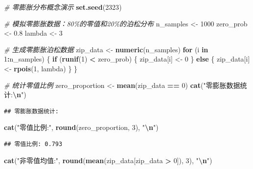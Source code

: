 \documentclass[
]{book}
\newenvironment{Shaded}{\begin{snugshade}}{\end{snugshade}}
\newcommand{\CommentTok}[1]{\textcolor[rgb]{0.56,0.35,0.01}{\textit{#1}}}
\newcommand{\ControlFlowTok}[1]{\textcolor[rgb]{0.13,0.29,0.53}{\textbf{#1}}}
\newcommand{\DecValTok}[1]{\textcolor[rgb]{0.00,0.00,0.81}{#1}}
\newcommand{\FloatTok}[1]{\textcolor[rgb]{0.00,0.00,0.81}{#1}}
\newcommand{\FunctionTok}[1]{\textcolor[rgb]{0.13,0.29,0.53}{\textbf{#1}}}
\newcommand{\NormalTok}[1]{#1}
\newcommand{\OtherTok}[1]{\textcolor[rgb]{0.56,0.35,0.01}{#1}}
\newcommand{\SpecialCharTok}[1]{\textcolor[rgb]{0.81,0.36,0.00}{\textbf{#1}}}
\newcommand{\StringTok}[1]{\textcolor[rgb]{0.31,0.60,0.02}{#1}}
\begin{document}
\begin{Shaded}
\begin{Highlighting}[]
\CommentTok{\# 零膨胀分布概念演示}
\FunctionTok{set.seed}\NormalTok{(}\DecValTok{2323}\NormalTok{)}

\CommentTok{\# 模拟零膨胀数据：80\%的零值和20\%的泊松分布}
\NormalTok{n\_samples }\OtherTok{\textless{}{-}} \DecValTok{1000}
\NormalTok{zero\_prob }\OtherTok{\textless{}{-}} \FloatTok{0.8}
\NormalTok{lambda }\OtherTok{\textless{}{-}} \DecValTok{3}

\CommentTok{\# 生成零膨胀泊松数据}
\NormalTok{zip\_data }\OtherTok{\textless{}{-}} \FunctionTok{numeric}\NormalTok{(n\_samples)}
\ControlFlowTok{for}\NormalTok{ (i }\ControlFlowTok{in} \DecValTok{1}\SpecialCharTok{:}\NormalTok{n\_samples) \{}
  \ControlFlowTok{if}\NormalTok{ (}\FunctionTok{runif}\NormalTok{(}\DecValTok{1}\NormalTok{) }\SpecialCharTok{\textless{}}\NormalTok{ zero\_prob) \{}
\NormalTok{    zip\_data[i] }\OtherTok{\textless{}{-}} \DecValTok{0}
\NormalTok{  \} }\ControlFlowTok{else}\NormalTok{ \{}
\NormalTok{    zip\_data[i] }\OtherTok{\textless{}{-}} \FunctionTok{rpois}\NormalTok{(}\DecValTok{1}\NormalTok{, lambda)}
\NormalTok{  \}}
\NormalTok{\}}

\CommentTok{\# 统计零值比例}
\NormalTok{zero\_proportion }\OtherTok{\textless{}{-}} \FunctionTok{mean}\NormalTok{(zip\_data }\SpecialCharTok{==} \DecValTok{0}\NormalTok{)}
\FunctionTok{cat}\NormalTok{(}\StringTok{"零膨胀数据统计:}\SpecialCharTok{\textbackslash{}n}\StringTok{"}\NormalTok{)}
\end{Highlighting}
\end{Shaded}

\begin{verbatim}
## 零膨胀数据统计:
\end{verbatim}

\begin{Shaded}
\begin{Highlighting}[]
\FunctionTok{cat}\NormalTok{(}\StringTok{"零值比例:"}\NormalTok{, }\FunctionTok{round}\NormalTok{(zero\_proportion, }\DecValTok{3}\NormalTok{), }\StringTok{"}\SpecialCharTok{\textbackslash{}n}\StringTok{"}\NormalTok{)}
\end{Highlighting}
\end{Shaded}

\begin{verbatim}
## 零值比例: 0.793
\end{verbatim}

\begin{Shaded}
\begin{Highlighting}[]
\FunctionTok{cat}\NormalTok{(}\StringTok{"非零值均值:"}\NormalTok{, }\FunctionTok{round}\NormalTok{(}\FunctionTok{mean}\NormalTok{(zip\_data[zip\_data }\SpecialCharTok{\textgreater{}} \DecValTok{0}\NormalTok{]), }\DecValTok{3}\NormalTok{), }\StringTok{"}\SpecialCharTok{\textbackslash{}n}\StringTok{"}\NormalTok{)}
\end{Highlighting}
\end{Shaded}
\end{document}
